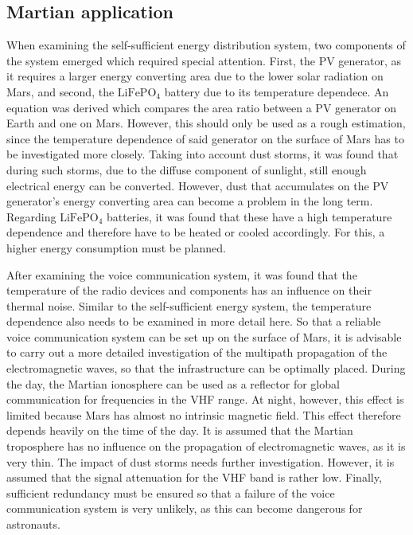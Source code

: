 \subsection{Martian application}
When examining the self-sufficient energy distribution system, two components of the system emerged which required special attention. First, the PV generator, as it requires a larger energy converting area due to the lower solar radiation on Mars, and second, the $\mathrm{LiFePO}_4$ battery due to its temperature dependece. An equation was derived which compares the area ratio between a PV generator on Earth and one on Mars. However, this should only be used as a rough estimation, since the temperature dependence of said generator on the surface of Mars has to be investigated more closely. Taking into account dust storms, it was found that during such storms, due to the diffuse component of sunlight, still enough electrical energy can be converted. However, dust that accumulates on the PV generator's energy converting area can become a problem in the long term. Regarding $\mathrm{LiFePO}_4$ batteries, it was found that these have a high temperature dependence and therefore have to be heated or cooled accordingly. For this, a higher energy consumption must be planned.

After examining the voice communication system, it was found that the temperature of the radio devices and components has an influence on their thermal noise. Similar to the self-sufficient energy system, the temperature dependence also needs to be examined in more detail here. So that a reliable voice communication system can be set up on the surface of Mars, it is advisable to carry out a more detailed investigation of the multipath propagation of the electromagnetic waves, so that the infrastructure can be optimally placed. During the day, the Martian ionosphere can be used as a reflector for global communication for frequencies in the VHF range. At night, however, this effect is limited because Mars has almost no intrinsic magnetic field. This effect therefore depends heavily on the time of the day. It is assumed that the Martian troposphere has no influence on the propagation of electromagnetic waves, as it is very thin. The impact of dust storms needs further investigation. However, it is assumed that the signal attenuation for the VHF band is rather low. Finally, sufficient redundancy must be ensured so that a failure of the voice communication system is very unlikely, as this can become dangerous for astronauts. 


